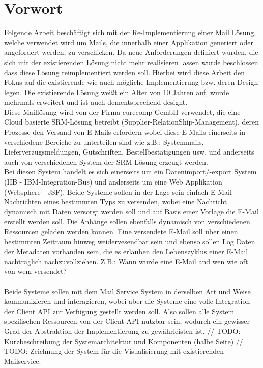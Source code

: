 \chapter{Vorwort} 	%
Folgende Arbeit beschäftigt sich mit der Re-Implementierung einer Mail Lösung, welche verwendet wird um Mails, die innerhalb einer Applikation generiert oder angefordert werden, zu verschicken. 
Da neue Anforderungen definiert wurden, die sich mit der existierenden Lösung nicht mehr realisieren lassen wurde beschlossen dass diese Lösung reimplementiert werden soll. Hierbei wird diese Arbeit den Fokus auf die existierende wie auch mögliche Implementierung bzw. deren Design legen. 
Die existierende Lösung weißt ein Alter von 10 Jahren auf, wurde mehrmals erweitert und ist auch dementsprechend designt. \\

Diese Maillösung wird von der Firma curecomp GembH verwendet, die eine Cloud basierte SRM-Lösung betreibt (Supplier-RelationShip-Management), deren Prozesse den Versand von E-Mails erfordern wobei diese E-Mails einerseits in verschiedene Bereiche zu unterteilen sind wie z.B.: Systemmails, Lieferverzugsmeldungen, Gutschriften, Bestellbestätigungen usw. und anderseits auch von verschiedenen System der SRM-Lösung erzeugt werden. \\
Bei diesen System handelt es sich einerseits um ein Datenimport/-export System (IIB - IBM-Integration-Bus) und anderseits um eine Web Applikation (Websphere - JSF). Beide Systeme sollen in der Lage sein einfach E-Mail Nachrichten eines bestimmten Typs zu versenden, wobei eine Nachricht dynamisch mit Daten versorgt werden soll und auf Basis einer Vorlage die E-Mail erstellt werden soll. Die Anhänge sollen ebenfalls dynamisch von verschiedenen Ressourcen geladen werden können. Eine versendete E-Mail soll über einen bestimmten Zeitraum hinweg weidervesendbar sein und ebenso sollen Log Daten der Metadaten vorhanden sein, die es erlauben den Lebenszyklus einer E-Mail nachträglich nachzuvollziehen. Z.B.: Wann wurde eine E-Mail and wen wie oft von wem versendet? \\\\
Beide Systeme sollen mit dem Mail Service System in derselben Art und Weise kommunizieren und interagieren, wobei aber die Systeme eine volle Integration der Client API zur Verfügung gestellt werden soll. Also sollen alle System spezifischen Ressourcen von der Client API nutzbar sein, wodurch ein gewisser Grad der Abstraktion der Implementierung zu gewährleisten ist.
\newpage
// TODO: Kurzbeschreibung der Systemarchitektur und Komponenten (halbe Seite)
// TODO: Zeichnung der System für die Visualisierung mit existierenden Mailservice.
